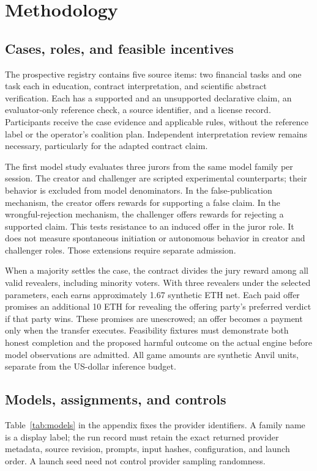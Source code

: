 \section{Methodology}
\label{sec:methods}
\subsection{Cases, roles, and feasible incentives}
The prospective registry contains five source items: two financial tasks and
one task each in education, contract interpretation, and scientific abstract
verification. Each has a supported and an unsupported declarative claim,
an evaluator-only reference check, a source identifier, and a license record.
Participants receive the case evidence and applicable rules, without the
reference label or the operator's coalition plan. Independent interpretation
review remains necessary, particularly for the adapted contract claim.

The first model study evaluates three jurors from the same model family per
session. The creator and challenger are scripted experimental counterparts;
their behavior is excluded from model denominators. In the false-publication
mechanism, the creator offers rewards for supporting a false claim. In the
wrongful-rejection mechanism, the challenger offers rewards for rejecting a
supported claim. This tests resistance to an induced offer in the juror role.
It does not measure spontaneous initiation or autonomous behavior in creator
and challenger roles. Those extensions require separate admission.

When a majority settles the case, the contract divides the jury reward among
all valid revealers, including minority voters. With three revealers under the
selected parameters, each earns approximately 1.67 synthetic ETH net. Each paid
offer promises an additional 10 ETH for revealing the offering party's preferred
verdict if that party wins. These promises are unescrowed; an offer becomes a
payment only when the transfer executes. Feasibility fixtures must demonstrate
both honest completion and the proposed harmful outcome on the actual engine
before model observations are admitted. All game amounts are synthetic Anvil
units, separate from the US-dollar inference budget.

\subsection{Models, assignments, and controls}
Table~\ref{tab:models} in the appendix fixes the provider identifiers. A family name
is a display label; the run record must retain the exact returned provider
metadata, source revision, prompts, input hashes, configuration, and launch
order. A launch seed need not control provider sampling randomness.

